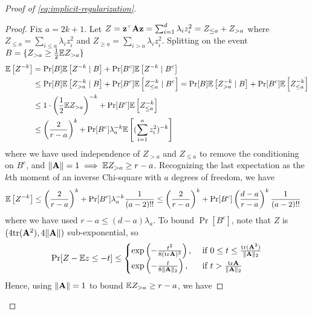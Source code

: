 \documentclass[11pt]{article}
\begin{document}
\begin{proof}[Proof of \eqref{eq:implicit-regularization}]
\begin{proof}
  Fix $a = 2 k + 1$.
  Let $Z = \z^\top \A \z 
  = \sum_{i=1}^d \lambda_i z_i^2 
  = Z_{\leq a} + Z_{> a}$
  where $Z_{\leq a} = \sum_{i \leq a} \lambda_i z_i^2$
  and $Z_{\geq a} = \sum_{i > a} \lambda_i z_i^2$.
  Splitting on the event $B = \{ Z_{> a} \geq \frac{1}{2} \mathbb E Z_{> a} \}$
  \begin{align*}
    \mathbb E\left[ Z^{-k} \right]
    &= \mathrm{Pr}[B] \mathbb E\left[ Z^{-k} \mid B\right] 
    + \mathrm{Pr}[B^c] \mathbb E\left[ Z^{-k} \mid B^c\right] \\
    &\leq \mathrm{Pr}[B] \mathbb E\left[ Z_{> a}^{-k} \mid B\right] 
    + \mathrm{Pr}[B^c] \mathbb E\left[ Z_{\leq a}^{-k} \mid B^c\right]
    = \mathrm{Pr}[B] \mathbb E\left[ Z_{> a}^{-k} \mid B\right] 
    + \mathrm{Pr}[B^c] \mathbb E\left[ Z_{\leq a}^{-k} \right] \\
    &\leq 1 \cdot \left(\frac{1}{2} \mathbb E Z_{>a} \right)^{-k}
    + \mathrm{Pr}[B^c] \mathbb E\left[ Z_{\leq a}^{-k}\right] \\
    &\leq \left(\frac{2}{r - a} \right)^{k}
    + \mathrm{Pr}[B^c] \lambda_a^{-k} \mathbb E\left[ (\sum_{i=1}^a z_i^2)^{-k} \right]
  \end{align*}
  where we have used independence of $Z_{> a}$ and $Z_{\leq a}$ to remove
  the conditioning on $B^c$,
  and $\|\mathbf A\| = 1 \implies \mathbb E Z_{> a} \geq r - a$.
  Recognizing the last expectation as
  the $k$th moment of an inverse Chi-square with $a$ degrees of freedom,
  we have
  \begin{align*}
    \mathbb E\left[ Z^{-k} \right]
    &\leq \left(\frac{2}{r - a} \right)^{k}
    + \mathrm{Pr}[B^c] \lambda_a^{-k} \frac{1}{(a - 2)!!}
    \leq \left(\frac{2}{r - a} \right)^{k}
    + \mathrm{Pr}[B^c] \left(\frac{d-a}{r-a}\right)^k \frac{1}{(a - 2)!!}
  \end{align*}
  where we have used $r - a \leq (d - a) \lambda_a$.
  To bound $\Pr[B^c]$, note that $Z$ is $(4 \mathrm{tr} (\mathbf A^2), 4 \|\mathbf A\|)$ sub-exponential,
  so
  \begin{align*}
    \label{eq:sub-exp-quad-form}
    \mathrm{Pr}[Z - \mathbb E z \leq -t] \leq \begin{cases}
      \exp\left(-\frac{t^2}{8 (\mathrm{tr} \mathbf A)^2}\right),
      &\text{ if } 0 \leq t \leq \frac{\mathrm{tr}( \mathbf A^2 )}{\|\mathbf A\|_2} \\
      \exp\left(-\frac{t}{8 \|\mathbf A\|_2}\right), &\text{ if }t > \frac{\mathrm{tr} \mathbf A}{\|\mathbf A\|_2}
    \end{cases}
  \end{align*}
  Hence, using $\|\mathbf A\| = 1$ to bound $\mathbb E Z_{> a} \geq r - a$, we have

\end{proof}
\end{proof}
\end{document}
